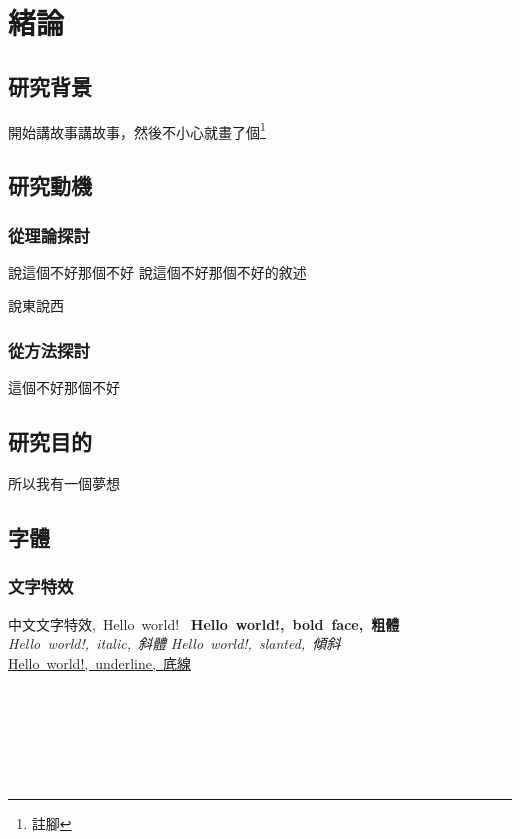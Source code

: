 
\chapter{緒論}

\section{研究背景}
開始講故事講故事，然後不小心就畫了個\footnote{註腳}


\section{研究動機}

\subsection{從理論探討}
\citet{doublepeason} 說這個不好那個不好
說這個不好那個不好的敘述\citep{doublepeason}

\citet{doublepeason} 說東說西

\subsection{從方法探討}
這個不好那個不好

\section{研究目的}
所以我有一個夢想

\newpage

\section{字體}
\subsection{文字特效}
\hbox{中文文字特效, Hello world!}
{\LARGE
    \hbox{\textbf{ Hello world!, bold face, 粗體}}
    \hbox{\textit{Hello world!, italic, 斜體}}
    \hbox{\textsl{Hello world!, slanted, 傾斜}}
    \hbox{\underline{Hello world!, underline, 底線}}
}

\\
\\
\\
\\
\\


